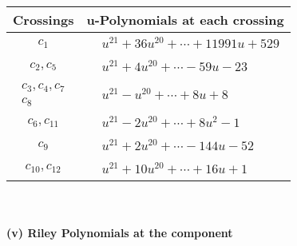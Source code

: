 \documentclass[1p]{elsarticle_modified}
\theoremstyle{definition}
\begin{document}
\begin{tabular}{m{50pt}|m{274pt}}
Crossings & \hspace{64pt}u-Polynomials at each crossing \\
\hline $$\begin{aligned}c_{1}\end{aligned}$$&$\begin{aligned}
&u^{21}+36 u^{20}+\cdots+11991 u+529
\end{aligned}$\\
\hline $$\begin{aligned}c_{2},c_{5}\end{aligned}$$&$\begin{aligned}
&u^{21}+4 u^{20}+\cdots-59 u-23
\end{aligned}$\\
\hline $$\begin{aligned}c_{3},c_{4},c_{7}\\c_{8}\end{aligned}$$&$\begin{aligned}
&u^{21}- u^{20}+\cdots+8 u+8
\end{aligned}$\\
\hline $$\begin{aligned}c_{6},c_{11}\end{aligned}$$&$\begin{aligned}
&u^{21}-2 u^{20}+\cdots+8 u^2-1
\end{aligned}$\\
\hline $$\begin{aligned}c_{9}\end{aligned}$$&$\begin{aligned}
&u^{21}+2 u^{20}+\cdots-144 u-52
\end{aligned}$\\
\hline $$\begin{aligned}c_{10},c_{12}\end{aligned}$$&$\begin{aligned}
&u^{21}+10 u^{20}+\cdots+16 u+1
\end{aligned}$\\
\hline
\end{tabular}\\~\\
\newpage\renewcommand{\arraystretch}{1}
\flushleft \textbf{(v) Riley Polynomials at the component}\newline \\
\end{document}
